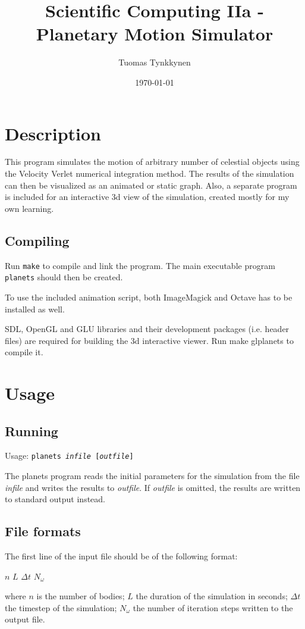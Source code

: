 \documentclass[a4paper]{article}
\title{Scientific Computing IIa - Planetary Motion Simulator}
\author{Tuomas Tynkkynen}
\date{\today}
\begin{document}
 \maketitle
 \section{Description}
 This program simulates the motion of arbitrary number of celestial objects using the Velocity Verlet\cite{VV} numerical integration method.
 The results of the simulation can then be visualized as an animated or static graph.
 Also, a separate program is included for an interactive 3d view of the simulation, created mostly for my own learning.
  \subsection{Compiling}
  Run \texttt{make} to compile and link the program.
  The main executable program \texttt{planets} should then be created.

  To use the included animation script, both ImageMagick and Octave has to be installed as well.

  SDL, OpenGL and GLU libraries and their development packages (i.e. header files) are required for building the 3d interactive viewer.
  Run make glplanets to compile it.
 \section{Usage}
  \subsection{Running}
  \begin{center}
  Usage: \texttt{planets \emph{infile} [\emph{outfile}]}\\
  \end{center}
  The planets program reads the initial parameters for the simulation from the file \emph{infile} and writes the results to \emph{outfile}.
  If \emph{outfile} is omitted, the results are written to standard output instead.
  \subsection{File formats}
   The first line of the input file should be of the following format:
   \begin{center}$n$ $L$ $\Delta t$ $N_\omega$\end{center}
   where $n$ is the number of bodies; $L$ the duration of the simulation in seconds; $\Delta t$ the timestep of the simulation;
   $N_\omega$ the number of iteration steps written to the output file.
\end{document}

